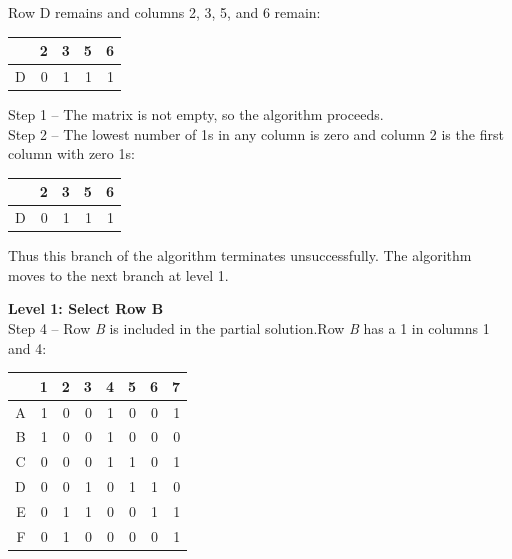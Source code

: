 \documentclass{mcmthesis}
\begin{document}
Row D remains and columns 2, 3, 5, and 6 remain:\\

\begin{table}[ht]
\centering
	\begin{tabular}{|r|r|r|r|r|}
	\hline
	  & 2 & 3 & 5 & 6\\
	\hline
	D & 0 & 1 & 1 & 1\\
	\hline
	\end{tabular}
\end{table}

Step 1 -- The matrix is not empty, so the algorithm proceeds.\\
\indent Step 2 -- The lowest number of 1s in any column is zero and column 2 is the first column with zero 1s:\\
\begin{table}[!ht]
\centering
	\begin{tabular}{|r|r|r|r|r|}
	\hline
	  & \textcolor[rgb]{0.98,0.00,0.00}2 & 3 & 5 & 6\\
	\hline
	D & 0 & 1 & 1 & 1\\
	\hline
	\end{tabular}
\end{table}

Thus this branch of the algorithm terminates unsuccessfully. The algorithm moves to the next branch at level 1.

\textbf{Level 1: Select Row B}\\
\indent Step 4 -- Row \textit{B} is included in the partial solution.Row \textit{B} has a 1 in columns 1 and 4:\\
\begin{table}[ht]
\centering
	\begin{tabular}{|r|r|r|r|r|r|r|r|}
		\hline
		     & \textcolor[rgb]{0.00,0.00,0.98}1 & 2 & 3 & \textcolor[rgb]{0.00,0.00,0.98}4 & 5 & 6 & 7\\
		     \hline
		   A & 1 & 0 & 0 & 1 & 0 & 0 & 1\\
		     \hline
		   \textcolor[rgb]{0.98,0.00,0.00}B & \textcolor[rgb]{0.98,0.00,0.00}1 & 0 & 0 & \textcolor[rgb]{0.98,0.00,0.00}1 & 0 & 0 & 0\\
		     \hline
		   C & 0 & 0 & 0 & 1 & 1 & 0 & 1\\
		     \hline
		   D & 0 & 0 & 1 & 0 & 1 & 1 & 0\\
		     \hline
		   E & 0 & 1 & 1 & 0 & 0 & 1 & 1\\
		     \hline
		   F & 0 & 1 & 0 & 0 & 0 & 0 & 1\\
		\hline
	\end{tabular}
\end{table}
\end{document}
